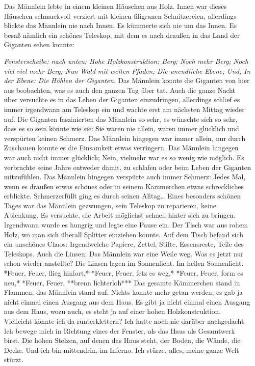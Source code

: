 \documentclass{article}
\title{\titlevar}
\author{\authorvar}
\date{\datevar}
\begin{document}
	\maketitle
	 
	Das Männlein lebte in einem kleinen Häuschen aus Holz. Innen war dieses Häuschen schmuckvoll verziert mit kleinen filigranen Schnitzereien, allerdings blickte das Männlein nie nach Innen. Es kümmerte sich nie um das Innen. Es besaß nämlich ein schönes Teleskop, mit dem es nach draußen in das Land der Giganten sehen konnte:  
	
	\textit{Fensterscheibe; nach unten; Hohe Holzkonstruktion; Berg; Noch mehr Berg; Noch viel viel mehr Berg; Nun Wald mit weiten Pfaden; Die unendliche Ebene; Und; In der Ebene: Die Höhlen der Giganten.}
	Das Männlein konnte die Giganten von hier aus beobachten, was es auch den ganzen Tag über tat. Auch die ganze Nacht über versuchte es in das Leben der Giganten einzudringen, allerdings schlief es immer irgendwann am Teleskop ein und wachte erst am nächsten Mittag wieder auf. Die Giganten faszinierten das Männlein so sehr, es wünschte sich so sehr, dass es so sein könnte wie sie: Sie waren nie allein, waren immer glücklich und verspürten keinen Schmerz. Das Männlein hingegen war immer allein, nur durch Zuschauen konnte es die Einsamkeit etwas verringern. Das Männlein hingegen war auch nicht immer glücklich; Nein, vielmehr war es so wenig wie möglich. Es verbrachte seine Jahre entweder damit, zu schlafen oder beim Leben der Giganten mitzufühlen. Das Männlein hingegen verspürte auch immer Schmerz: Jedes Mal, wenn es draußen etwas schönes oder in seinem Kämmerchen etwas schreckliches erblickte. Schmerzerfüllt ging es durch seinen Alltag…  
	Eines besonders schönen Tages war das Männlein gezwungen, sein Teleskop zu reparieren, keine Ablenkung. Es versuchte, die Arbeit möglichst schnell hinter sich zu bringen. Irgendwann wurde es hungrig und legte eine Pause ein. Der Tisch war aus rohem Holz, wo man sich überall Splitter einziehen konnte. Auf dem Tisch befand sich ein unschönes Chaos: Irgendwelche Papiere, Zettel, Stifte, Essensreste, Teile des Teleskops. Auch die Linsen. Das Männlein war eine Weile weg. Was es jetzt nur schon wieder anstellte? Die Linsen lagen im Sonnenlicht. Im hellen Sonnenlicht.  
	*Feuer, Feuer, flieg hinfort,*  
	*Feuer, Feuer, fetz es weg,*  
	*Feuer, Feuer, form es neu,*  
	*Feuer, Feuer, **brenn lichterloh\!***  
	Das gesamte Kämmerchen stand in Flammen, das Männlein stand auf. Nichts konnte mehr getan werden, es gab ja nicht einmal einen Ausgang aus dem Haus.  
	Es gibt ja nicht einmal einen Ausgang aus dem Haus, wozu auch, es steht ja auf einer hohen Holzkonstruktion. Vielleicht könnte ich da runterklettern? Ich hatte noch nie darüber nachgedacht. Ich bewege mich in Richtung eines der Fenster, als das Haus als Gesamtwerk birst. Die hohen Stelzen, auf denen das Haus steht, der Boden, die Wände, die Decke. Und ich bin mittendrin, im Inferno. Ich stürze, alles, meine ganze Welt stürzt.
	
\end{document}
